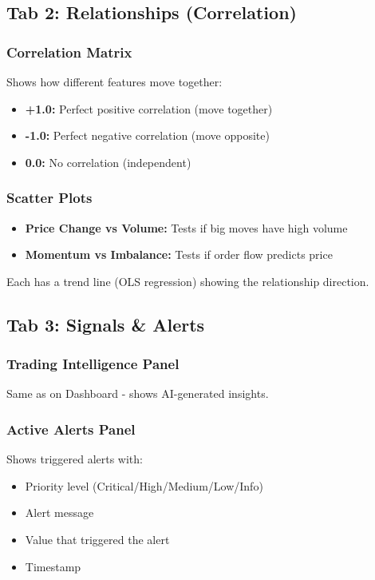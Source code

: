 \documentclass[12pt,a4paper]{article}
\begin{document}
\subsection{Tab 2: Relationships (Correlation)}

\subsubsection{Correlation Matrix}
Shows how different features move together:
\begin{itemize}
    \item \textbf{+1.0:} Perfect positive correlation (move together)
    \item \textbf{-1.0:} Perfect negative correlation (move opposite)
    \item \textbf{0.0:} No correlation (independent)
\end{itemize}

\subsubsection{Scatter Plots}
\begin{itemize}
    \item \textbf{Price Change vs Volume:} Tests if big moves have high volume
    \item \textbf{Momentum vs Imbalance:} Tests if order flow predicts price
\end{itemize}

Each has a trend line (OLS regression) showing the relationship direction.

\subsection{Tab 3: Signals \& Alerts}

\subsubsection{Trading Intelligence Panel}
Same as on Dashboard - shows AI-generated insights.

\subsubsection{Active Alerts Panel}
Shows triggered alerts with:
\begin{itemize}
    \item Priority level (Critical/High/Medium/Low/Info)
    \item Alert message
    \item Value that triggered the alert
    \item Timestamp
\end{itemize}
\end{document}
